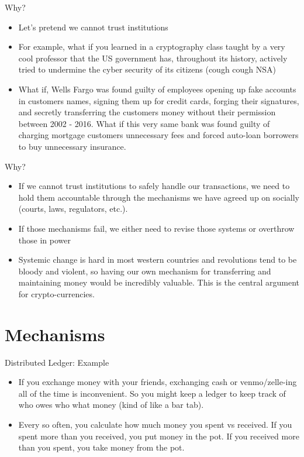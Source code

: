 \documentclass[handout]{beamer}
\begin{document}
\begin{frame}{Why?}
    \begin{itemize}
        \item \pause Let's pretend we cannot trust institutions
        \item \pause For example, what if you learned in a cryptography class taught by a very cool professor that the US government has, throughout its history, actively tried to undermine the cyber security of its citizens (cough cough NSA)
        \item \pause What if, Wells Fargo was found guilty of employees opening up fake accounts in customers names, signing them up for credit cards, forging their signatures, and secretly transferring the customers money without their permission between 2002 - 2016. What if this very same bank was found guilty of charging mortgage customers unnecessary fees and forced auto-loan borrowers to buy unnecessary insurance.
    \end{itemize}
\end{frame}

\begin{frame}{Why?}
    \begin{itemize}
        \item \pause If we cannot trust institutions to safely handle our transactions, we need to hold them accountable through the mechanisms we have agreed up on socially (courts, laws, regulators, etc.).
        \item \pause If those mechanisms fail, we either need to revise those systems or overthrow those in power
        \item \pause Systemic change is hard in most western countries and revolutions tend to be bloody and violent, so having our own mechanism for transferring and maintaining money would be incredibly valuable. This is the central argument for crypto-currencies.
    \end{itemize}
\end{frame}

\section{Mechanisms}

\begin{frame}{Distributed Ledger: Example}
    \begin{itemize}
        \item \pause If you exchange money with your friends, exchanging cash or venmo/zelle-ing all of the time is inconvenient. So you might keep a ledger to keep track of who owes who what money (kind of like a bar tab).
        \item \pause Every so often, you calculate how much money you spent vs received. If you spent more than you received, you put money in the pot. If you received more than you spent, you take money from the pot.
    \end{itemize}
\end{frame}
\end{document}
